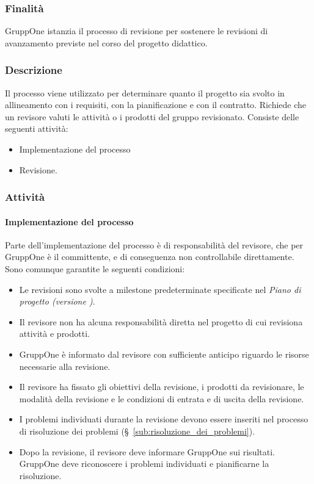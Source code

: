 \documentclass[../../norme-di-progetto.tex]{subfiles}
\begin{document}
\subsubsection{Finalità}%
\label{subs:revisione/finalita}

GruppOne istanzia il processo di revisione per sostenere le revisioni di avanzamento previste nel corso del progetto didattico.

\subsubsection{Descrizione}%
\label{subs:revisione/descrizione}

Il processo viene utilizzato per determinare quanto il progetto sia svolto in allineamento con i requisiti, con la pianificazione e con il contratto.
Richiede che un revisore valuti le attività o i prodotti del gruppo revisionato.
Consiste delle seguenti attività:

\begin{itemize}
  \item Implementazione del processo
  \item Revisione.
\end{itemize}

\subsubsection{Attività}%
\label{subs:revisione/attivita}

\paragraph{Implementazione del processo}%
\label{par:revisione/implementazione_del_processo}

Parte dell'implementazione del processo è di responsabilità del revisore, che per GruppOne è il committente, e di conseguenza non controllabile direttamente.
Sono comunque garantite le seguenti condizioni:

\begin{itemize}
  \item Le revisioni sono svolte a milestone predeterminate specificate nel \textit{Piano di progetto (versione \versione)}.
  \item Il revisore non ha alcuna responsabilità diretta nel progetto di cui revisiona attività e prodotti.
  \item GruppOne è informato dal revisore con sufficiente anticipo riguardo le risorse necessarie alla revisione.
  \item Il revisore ha fissato gli obiettivi della revisione, i prodotti da revisionare, le modalità della revisione e le condizioni di entrata e di uscita della revisione.
  \item I problemi individuati durante la revisione devono essere inseriti nel processo di risoluzione dei problemi (§~\ref{sub:risoluzione_dei_problemi}).
  \item Dopo la revisione, il revisore deve informare GruppOne sui risultati. GruppOne deve riconoscere i problemi individuati e pianificarne la risoluzione.
\end{itemize}
\end{document}
